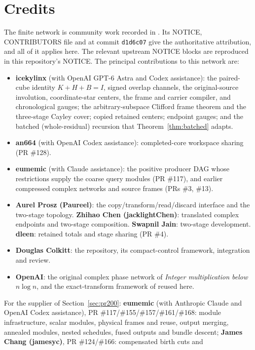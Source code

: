 \documentclass[11pt]{article}
\theoremstyle{definition}
\begin{document}
\section{Credits}\label{sec:credits}
The finite network is community work recorded in \cite{cms}. Its NOTICE,
CONTRIBUTORS file and  at commit
\texttt{d1d6c07} give the authoritative attribution, and all of it applies
here. The relevant upstream NOTICE blocks are reproduced in this repository's
NOTICE. The principal contributions to this network are:
\begin{itemize}
\item \textbf{icekylinx} (with OpenAI GPT-6 Astra and Codex assistance):
  the paired-cube identity $K+H+B=I$, signed overlap channels, the
  original-source involution, coordinate-star centers, the frame and carrier
  compiler, and chronological gauges; the arbitrary-subspace Clifford frame
  theorem and the three-stage Cayley cover; copied retained centers; endpoint
  gauges; and the batched (whole-residual) recursion that
  Theorem~\ref{thm:batched} adapts.
\item \textbf{an664} (with OpenAI Codex assistance): completed-core
  workspace sharing (PR \#128).
\item \textbf{eumemic} (with Claude assistance): the positive producer DAG
  whose restrictions supply the coarse query modules (PR \#117), and earlier
  compressed complex networks and source frames (PRs \#3, \#13).
\item \textbf{Aurel Prosz (Paureel)}: the copy/transform/read/discard interface
  and the two-stage topology. \textbf{Zhihao Chen (jacklightChen)}: translated
  complex endpoints and two-stage composition. \textbf{Swapnil Jain}:
  two-stage development. \textbf{dleen}: retained totals and stage sharing
  (PR \#4).
\item \textbf{Douglas Colkitt}: the repository, its compact-control framework,
  integration and review.
\item \textbf{OpenAI}: the original complex phase network of
  \emph{Integer multiplication below $n\log n$}, and the exact-transform
  framework of \cite{oai-dft} reused here.
\end{itemize}
For the supplier of Section~\ref{sec:pr200}: \textbf{eumemic} (with Anthropic
Claude and OpenAI Codex assistance), PR \#117/\#155/\#157/\#161/\#168: module
infrastructure, scalar modules, physical frames and reuse, output merging,
annealed modules, nested schedules, fused outputs and bundle descent;
\textbf{James Chang (jamesyc)}, PR \#124/\#166: compensated birth cuts and
\end{document}
